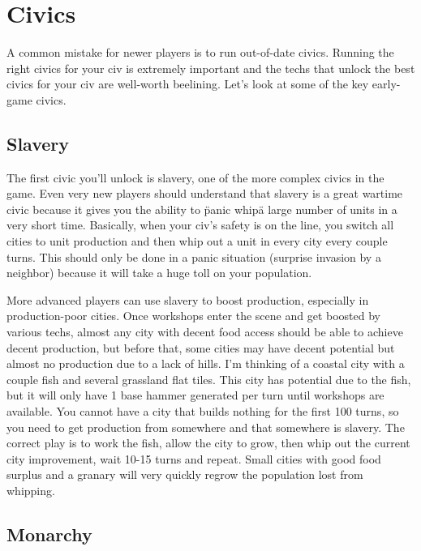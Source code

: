 \documentclass[10pt]{article}
\begin{document}
\section*{Civics}

A common mistake for newer players is to run out-of-date civics. Running the right civics
for your civ is extremely important and the techs that unlock the best civics for your civ
are well-worth beelining. Let's look at some of the key early-game civics.

\subsection*{Slavery}

The first civic you'll unlock is slavery, one of the more complex civics in the game. Even very
new players should understand that slavery is a great wartime civic because it gives you the
ability to \"panic whip\" a large number of units in a very short time. Basically, when your
civ's safety is on the line, you switch all cities to unit production and then whip out a unit
in every city every couple turns. This should only be done in a panic situation (surprise invasion
by a neighbor) because it will take a huge toll on your population.

More advanced players can use slavery to boost production, especially in production-poor cities.
Once workshops enter the scene and get boosted by various techs, almost any city with decent
food access should be able to achieve decent production, but before that, some cities may have
decent potential but almost no production due to a lack of hills. I'm thinking of a coastal city
with a couple fish and several grassland flat tiles. This city has potential due to the fish, but
it will only have 1 base hammer generated per turn until workshops are available. You cannot have
a city that builds nothing for the first 100 turns, so you need to get production from somewhere and
that somewhere is slavery. The correct play is to work the fish, allow the city to grow, then whip
out the current city improvement, wait 10-15 turns and repeat. Small cities with good food surplus
and a granary will very quickly regrow the population lost from whipping.

\subsection*{Monarchy}
\end{document}
